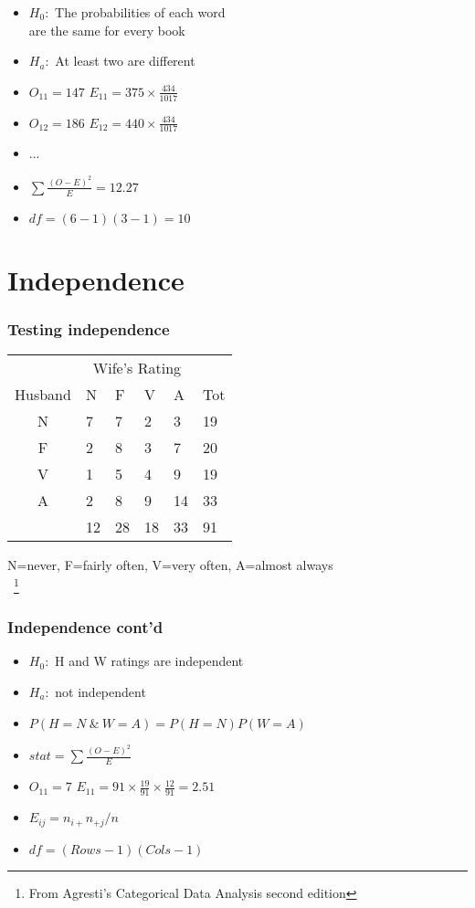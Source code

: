 \documentclass[aspectratio=169]{beamer}
\begin{document}
\begin{frame}
\begin{itemize}
\item $H_0:$ The probabilities of each word \\
  are the same for every book
\item $H_a:$ At least two are different 
\item $O_{11} = 147$ $E_{11} = 375 \times \frac{434}{1017}$
\item $O_{12} = 186$ $E_{12} = 440 \times \frac{434}{1017}$
\item ...
\item $\sum \frac{(O - E)^2}{E} = 12.27$
\item $df = (6 - 1) (3 - 1) = 10$ 
\end{itemize}
\end{frame}

\section{Independence}
\begin{frame}\frametitle{Testing independence}
\ttfamily
\begin{center}
\begin{tabular}{clllll}  
& \multicolumn{4}{c}{Wife's Rating} \\ 
Husband & N & F & V & A & Tot               \\ \hline
N & 7  &7  & 2  & 3  & 19 \\ 
F & 2  &8  & 3  & 7  & 20 \\ 
V & 1  &5  & 4  & 9  & 19 \\ 
A & 2  &8  & 9  & 14 & 33 \\ \hline
  & 12 &28 & 18 & 33 & 91 \\
\end{tabular}
\end{center}
N=never, F=fairly often, V=very often, A=almost always \\
~\footnote{From Agresti's Categorical Data Analysis second edition}
\normalfont
\end{frame}

\begin{frame}\frametitle{Independence cont'd}
\begin{itemize}
\item $H_0:$ H and W ratings are independent
\item $H_a:$ not independent
\item $P(H = N ~\&~ W = A) = P(H = N)P(W = A)$ 
\item $stat = \sum \frac{(O - E)^2}{E}$
\item $O_{11} = 7$ $E_{11} = 91\times\frac{19}{91}\times\frac{12}{91} = 2.51$
\item $E_{ij} = n_{i+}n_{+j}/n$
\item $df = (Rows - 1)(Cols - 1)$
\end{itemize}
\end{frame}
\end{document}
